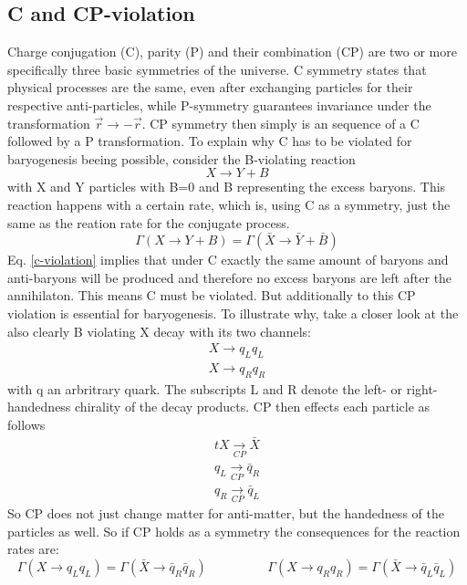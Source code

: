 \subsection{C and CP-violation}
Charge conjugation (C), parity (P) and their combination (CP) are two or more specifically three basic symmetries of the universe. C symmetry states that physical processes are the same, even after exchanging particles for their respective anti-particles, while P-symmetry guarantees invariance under the transformation $\vec{r}\rightarrow-\vec{r}$. CP symmetry then simply is an sequence of a C followed by a P transformation. \newline
To explain why C has to be violated for baryogenesis beeing possible, consider the B-violating reaction
\begin{equation*}
	X\rightarrow Y+B
\end{equation*}
with X and Y particles with B=0 and B representing the excess baryons. This reaction happens with a certain rate, which is, using C as a symmetry, just the same as the reation rate for the conjugate process.
\begin{equation}
	\Gamma(X\rightarrow Y+B)=\Gamma(\bar{X}\rightarrow \bar{Y}+\bar{B})
	\label{c-violation}
\end{equation}
Eq. \ref{c-violation} implies that under C exactly the same amount of baryons and anti-baryons will be produced and therefore no excess baryons are left after the annihilaton. This means C must be violated. \newline
But additionally to this CP violation is essential for baryogenesis. To illustrate why, take a closer look at the also clearly B  violating X decay with its two channels:
\begin{align*}
	X\rightarrow q_Lq_L\\
	X\rightarrow q_Rq_R
\end{align*}
with q an arbritrary quark. The subscripts L and R denote the left- or right-handedness chirality of the decay products. CP then effects each particle as follows
\begin{align*}t
	X\underset{CP}{\longrightarrow}\bar{X}\\
	q_{L}\underset{CP}{\longrightarrow}\bar{q}_{R}\\
	q_{R}\underset{CP}{\longrightarrow}\bar{q}_{L}
\end{align*}
So CP does not just change matter for anti-matter, but the handedness of the particles as well. So if CP holds as a symmetry the consequences for the reaction rates are:
\begin{equation*}
	\Gamma(X\rightarrow q_Lq_L)=\Gamma(\bar{X}\rightarrow \bar{q}_R\bar{q}_R)\hspace{2cm}\Gamma(X\rightarrow q_Rq_R)=\Gamma(\bar{X}\rightarrow \bar{q}_L\bar{q}_L)
\end{equation*}
